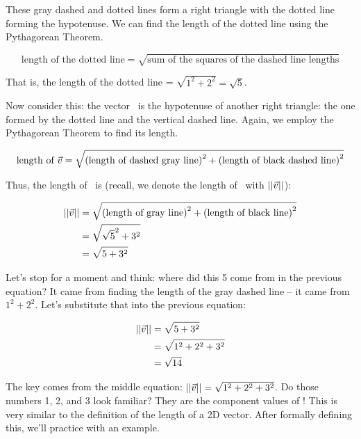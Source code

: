 These gray dashed and dotted lines form a right triangle with the dotted line forming the hypotenuse. We can find the length of the dotted line using the Pythagorean Theorem. 

$$\text{length of the dotted line} = \sqrt{ \text{sum of the squares of the dashed line lengths}}$$

That is, the length of the dotted line = $\sqrt{1^2 + 2^2} = \sqrt{5}$.

Now consider this: the vector \vv\ is the hypotenuse of another right triangle: the one formed by the dotted line and the vertical dashed line. Again, we employ the Pythagorean Theorem to find its length.

$$\text{length of } \vec{v} = \sqrt{ \text{(length of dashed gray line)}^2 + \text{(length of black dashed line)}^2}$$

Thus, the length of \vv\ is (recall, we denote the length of \vv\ with $||\vec{v}||$):

\begin{align*}
||\vec{v}|| &= \sqrt{\text{(length of gray line)}^2 + \text{(length of black line)}^2} \\
				&= \sqrt{ \sqrt{5}^2 + 3^2}\\
				&= \sqrt{ 5 + 3^2}\\
\end{align*}

Let's stop for a moment and think: where did this 5 come from in the previous equation? It came from finding the length of the gray dashed line -- it came from $1^2+2^2$. Let's substitute that into the previous equation:

\begin{align*}
||\vec{v}||	&= \sqrt{5+ 3^2} \\
				&= \sqrt{1^2+2^2+3^2}\\
				&= \sqrt{14}\\
\end{align*}

The key comes from the middle equation: $||\vec{v}|| = \sqrt{1^2+2^2+3^2}$. Do those numbers 1, 2, and 3 look familiar? They are the component values of \vv! This is very similar to the definition of the length of a 2D vector. After formally defining this, we'll practice with an example.


